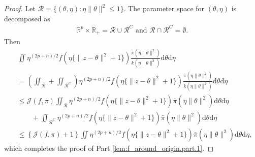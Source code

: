 \documentclass[preprint,11pt]{imsart}
\numberwithin{equation}{section}
\theoremstyle{plain}
\theoremstyle{definition}
\theoremstyle{remark}
\newcommand{\rd}{\mathrm{d}}
\begin{document}
\begin{proof}
 Let $\mathcal{R}=\{(\theta,\eta):\eta\|\theta\|^2\leq 1\}$.
 The parameter space for $(\theta,\eta)$ is decomposed as
 \begin{align*}
  \mathbb{R}^p\times \mathbb{R}_+=\mathcal{R}\cup\mathcal{R}^C\text{ and }
  \mathcal{R}\cap\mathcal{R}^C=\emptyset.
 \end{align*}
 Then
\begin{equation}\label{eq:lem:f_around_origin.part.1.1}
 \begin{split}
  & \iint   \eta^{(2p+n)/2} f(\eta\{\|z-\theta\|^2+1\})
  \frac{\bar{\pi}(\eta\|\theta\|^2)}{k(\eta\|\theta\|^2)} \rd \theta   \rd \eta \\
 &= \left(\iint_{\mathcal{R}}+\iint_{\mathcal{R}^C} \right)   \eta^{(2p+n)/2} f(\eta\{\|z-\theta\|^2+1\}) \frac{\bar{\pi}(\eta\|\theta\|^2)}{k(\eta\|\theta\|^2)} \rd \theta   \rd \eta \\
 & \leq \mathcal{J}(f,\pi)\iint_{\mathcal{R}}  \eta^{(2p+n)/2} f(\eta\{\|z-\theta\|^2+1\}) \bar{\pi}(\eta\|\theta\|^2) \rd \theta   \rd \eta \\
 &\qquad +\iint_{\mathcal{R}^C}  \eta^{(2p+n)/2} f(\eta\{\|z-\theta\|^2+1\}) \bar{\pi}(\eta\|\theta\|^2) \rd \theta   \rd \eta \\
&\leq  \left\{\mathcal{J}(f,\pi)+1\right\}\iint   \eta^{(2p+n)/2} f(\eta\{\|z-\theta\|^2+1\}) \bar{\pi}(\eta\|\theta\|^2) \rd \theta   \rd \eta,
 \end{split}
\end{equation}
 which completes the proof of Part \ref{lem:f_around_origin.part.1}.


\end{proof}
\end{document}
